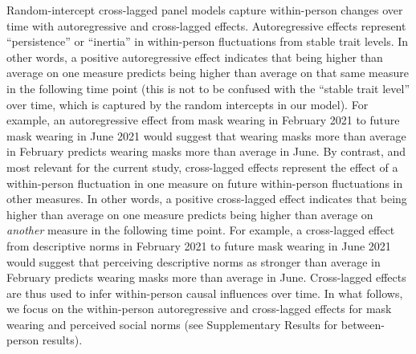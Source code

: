 \documentclass[
  man, donotrepeattitle,floatsintext]{apa6}
\begin{document}
Random-intercept cross-lagged panel models capture within-person changes over time with autoregressive and cross-lagged effects. Autoregressive effects represent ``persistence'' or ``inertia'' in within-person fluctuations from stable trait levels. In other words, a positive autoregressive effect indicates that being higher than average on one measure predicts being higher than average on that same measure in the following time point (this is not to be confused with the ``stable trait level'' over time, which is captured by the random intercepts in our model). For example, an autoregressive effect from mask wearing in February 2021 to future mask wearing in June 2021 would suggest that wearing masks more than average in February predicts wearing masks more than average in June. By contrast, and most relevant for the current study, cross-lagged effects represent the effect of a within-person fluctuation in one measure on future within-person fluctuations in other measures. In other words, a positive cross-lagged effect indicates that being higher than average on one measure predicts being higher than average on \emph{another} measure in the following time point. For example, a cross-lagged effect from descriptive norms in February 2021 to future mask wearing in June 2021 would suggest that perceiving descriptive norms as stronger than average in February predicts wearing masks more than average in June. Cross-lagged effects are thus used to infer within-person causal influences over time. In what follows, we focus on the within-person autoregressive and cross-lagged effects for mask wearing and perceived social norms (see Supplementary Results for between-person results).
\end{document}
